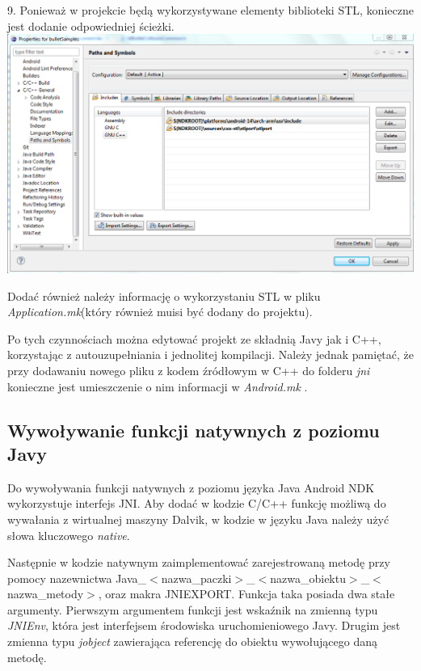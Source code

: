   9. Ponieważ w projekcie będą wykorzystywane elementy biblioteki STL,
  konieczne jest dodanie odpowiedniej ścieżki.\\
  
  \includegraphics[width=\textwidth]{./img/ndkroot.png}
  
  Dodać również należy informację o wykorzystaniu STL w pliku
  \emph{Application.mk}(który również muisi być dodany do projektu).
  
  
  
  Po tych czynnościach można edytować projekt ze składnią Javy jak i C++,
  korzystając z autouzupełniania i jednolitej kompilacji. Należy jednak
  pamiętać, że przy dodawaniu nowego pliku z kodem źródłowym w C++ do folderu
  \emph{jni} konieczne jest umieszczenie o nim informacji w \emph{Android.mk} .

\subsection{Wywoływanie funkcji natywnych z poziomu Javy}
Do wywoływania funkcji natywnych z poziomu języka Java Android NDK wykorzystuje
interfejs JNI. Aby dodać w kodzie C/C++ funkcję możliwą do wywałania z
wirtualnej maszyny Dalvik, w kodzie w języku Java należy użyć słowa kluczowego
\emph{native}.



Następnie w kodzie natywnym zaimplementować zarejestrowaną metodę przy pomocy
nazewnictwa
Java\_$<$nazwa\_paczki$>$\_$<$nazwa\_obiektu$>$\_$<$nazwa\_metody$>$, oraz
makra JNIEXPORT. Funkcja taka posiada dwa stałe argumenty. Pierwszym argumentem
funkcji jest wskaźnik na zmienną typu \emph{JNIEnv}, która jest interfejsem
środowiska uruchomieniowego Javy. Drugim jest zmienna typu \emph{jobject}
zawierająca referencję do obiektu wywołującego daną metodę.

